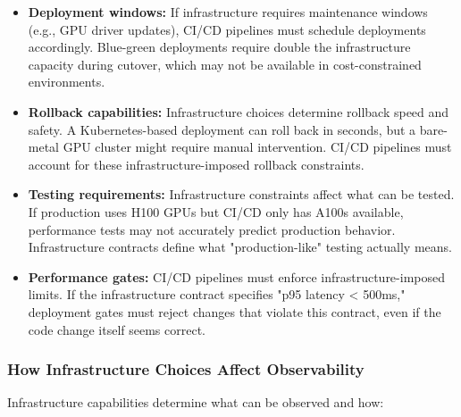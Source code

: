 \begin{itemize}
    \item \textbf{Deployment windows:} If infrastructure requires maintenance windows (e.g., GPU driver updates), CI/CD pipelines must schedule deployments accordingly. Blue-green deployments require double the infrastructure capacity during cutover, which may not be available in cost-constrained environments.
    
    \item \textbf{Rollback capabilities:} Infrastructure choices determine rollback speed and safety. A Kubernetes-based deployment can roll back in seconds, but a bare-metal GPU cluster might require manual intervention. CI/CD pipelines must account for these infrastructure-imposed rollback constraints.
    
    \item \textbf{Testing requirements:} Infrastructure constraints affect what can be tested. If production uses H100 GPUs but CI/CD only has A100s available, performance tests may not accurately predict production behavior. Infrastructure contracts define what "production-like" testing actually means.
    
    \item \textbf{Performance gates:} CI/CD pipelines must enforce infrastructure-imposed limits. If the infrastructure contract specifies "p95 latency < 500ms," deployment gates must reject changes that violate this contract, even if the code change itself seems correct.
\end{itemize}

\subsubsection{How Infrastructure Choices Affect Observability}

Infrastructure capabilities determine what can be observed and how:


